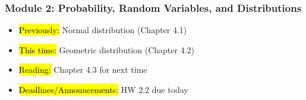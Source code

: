 
\begin{frame}
    \frametitle{Module 2: Probability, Random Variables, and Distributions}
    \begin{itemize}
        \item \hl{Previously: } Normal distribution (Chapter 4.1)
        \item \hl{This time: } Geometric distribution (Chapter 4.2)
        \item \hl{Reading: } Chapter 4.3 for next time
        \item \hl{Deadlines/Announcements: } HW 2.2 due today
    \end{itemize}
    
\end{frame}
    